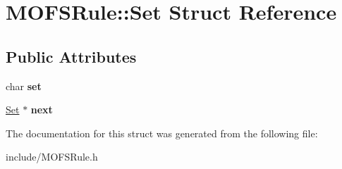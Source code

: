 \hypertarget{structMOFSRule_1_1Set}{\section{M\-O\-F\-S\-Rule\-:\-:Set Struct Reference}
\label{structMOFSRule_1_1Set}
}
\subsection*{Public Attributes}
\begin{DoxyCompactItemize}
\item 
\hypertarget{structMOFSRule_1_1Set_a4acfeabdf9c4559932a3e1da547d6630}{char {\bfseries set}}\label{structMOFSRule_1_1Set_a4acfeabdf9c4559932a3e1da547d6630}

\item 
\hypertarget{structMOFSRule_1_1Set_a693b1922d6b82d56e61778d80419106c}{\hyperlink{structMOFSRule_1_1Set}{Set} $\ast$ {\bfseries next}}\label{structMOFSRule_1_1Set_a693b1922d6b82d56e61778d80419106c}

\end{DoxyCompactItemize}


The documentation for this struct was generated from the following file\-:\begin{DoxyCompactItemize}
\item 
include/M\-O\-F\-S\-Rule.\-h\end{DoxyCompactItemize}

